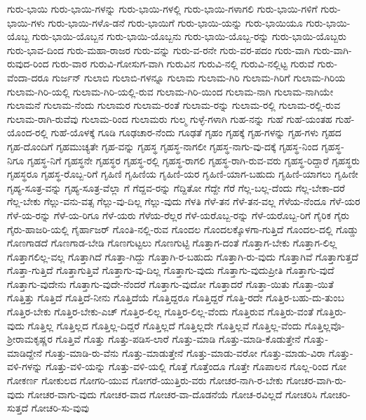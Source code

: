 {ಗುರು-ಭಾಯಿ
ಗುರು-ಭಾಯಿ-ಗಳನ್ನು
ಗುರು-ಭಾಯಿ-ಗಳಲ್ಲಿ
ಗುರು-ಭಾಯಿ-ಗಳಾಗಲಿ
ಗುರು-ಭಾಯಿ-ಗಳಿಗೆ
ಗುರು-ಭಾಯಿ-ಗಳು
ಗುರು-ಭಾಯಿ-ಗಳೊ-ಡನೆ
ಗುರು-ಭಾಯಿಗೆ
ಗುರು-ಭಾಯಿ-ಯನ್ನು
ಗುರು-ಭಾಯಿಯೂ
ಗುರು-ಭಾಯಿ-ಯೊಬ್ಬ
ಗುರು-ಭಾಯಿ-ಯೊಬ್ಬನ
ಗುರು-ಭಾಯಿ-ಯೊಬ್ಬನು
ಗುರು-ಭಾಯಿ-ಯೊಬ್ಬ-ರನ್ನು
ಗುರು-ಭಾಯಿ-ಯೊಬ್ಬರು
ಗುರು-ಭಾವ-ದಿಂದ
ಗುರು-ಮಹಾ-ರಾಜರ
ಗುರು-ವನ್ನು
ಗುರು-ವ-ರನೇ
ಗುರು-ವರ-ಪದಂ
ಗುರು-ವಾಗಿ
ಗುರು-ವಾಗಿ-ರುವುದ-ರಿಂದ
ಗುರು-ವಾರ
ಗುರುವಿ-ಗೋಸುಗ-ವಾಗಿ
ಗುರುವಿನ
ಗುರುವಿ-ನಲ್ಲಿ
ಗುರುವಿ-ನಲ್ಲಿಟ್ಟ
ಗುರುವೆ
ಗುರು-ವೆಂದಾ-ದರೂ
ಗುರ್ಜನ್
ಗುಲಾಬಿ
ಗುಲಾಬಿ-ಗಳನ್ನೂ
ಗುಲಾಮ
ಗುಲಾಮ-ಗಿರಿ
ಗುಲಾಮ-ಗಿರಿಗೆ
ಗುಲಾಮ-ಗಿರಿಯ
ಗುಲಾಮ-ಗಿರಿ-ಯಲ್ಲಿ
ಗುಲಾಮ-ಗಿರಿ-ಯಲ್ಲಿ-ರುವ
ಗುಲಾಮ-ಗಿರಿ-ಯಿಂದ
ಗುಲಾಮ-ನಾಗಿ
ಗುಲಾಮ-ನಾಗಿಯೇ
ಗುಲಾಮನೆ
ಗುಲಾಮ-ನೆಂದು
ಗುಲಾಮರ
ಗುಲಾಮ-ರಂತೆ
ಗುಲಾಮ-ರನ್ನು
ಗುಲಾಮ-ರಲ್ಲಿ
ಗುಲಾಮ-ರಲ್ಲಿ-ರುವ
ಗುಲಾಮ-ರಾಗಿ-ರುವೆವು
ಗುಲಾಮ-ರಿಂದ
ಗುಲಾಮರು
ಗುಲ್ಮ
ಗುಳ್ಳೆ-ಗಳಾಗಿ
ಗುಹ-ನನ್ನು
ಗುಹೆ
ಗುಹೆ-ಯಂತಹ
ಗುಹೆ-ಯೊಂದ-ರಲ್ಲಿ
ಗುಹೆ-ಯೊಳಕ್ಕೆ
ಗೂಡಿ
ಗೂಢಚಾರ-ನೆಂದು
ಗೂಢತೆ
ಗೃಹಂ
ಗೃಹಕ್ಕೆ
ಗೃಹ-ಗಳನ್ನು
ಗೃಹ-ಗಳು
ಗೃಹದ
ಗೃಹ-ದೊಂದಿಗೆ
ಗೃಹಮುಚ್ಯತೇ
ಗೃಹ-ವನ್ನು
ಗೃಹಸ್ಥ
ಗೃಹಸ್ಥ-ನಾಗಲೀ
ಗೃಹಸ್ಥ-ನಾಗು-ವು-ದಕ್ಕೆ
ಗೃಹಸ್ಥ-ನಿಂದ
ಗೃಹಸ್ಥ-ನಿಗೂ
ಗೃಹಸ್ಥ-ನಿಗೆ
ಗೃಹಸ್ಥನೇ
ಗೃಹಸ್ಥರ
ಗೃಹಸ್ಥ-ರಲ್ಲಿ
ಗೃಹಸ್ಥ-ರಾಗಲಿ
ಗೃಹಸ್ಥ-ರಾಗಿ-ರುವ-ವರು
ಗೃಹಸ್ಥ-ರಿದ್ದಾರೆ
ಗೃಹಸ್ಥರು
ಗೃಹಸ್ಥರೂ
ಗೃಹಸ್ಥ-ರೊಬ್ಬ-ರಿಗೆ
ಗೃಹಿಣಿ
ಗೃಹಿಣಿಯ
ಗೃಹಿಣಿ-ಯರ
ಗೃಹಿಣಿ-ಯಾಗ-ಬಹುದು
ಗೃಹಿಣಿ-ಯಾಗಲು
ಗೃಹಿಣೀ
ಗೃಹ್ಯ-ಸೂತ್ರ-ವನ್ನು
ಗೃಹ್ಯ-ಸೂತ್ರ-ವೆಲ್ಲಾ
ಗೆ
ಗೆದ್ದವ-ರನ್ನು
ಗೆದ್ದಿತೋ
ಗೆದ್ದೇ
ಗೆರೆ
ಗೆಲ್ಲ-ಬಲ್ಲ-ದೆಂದು
ಗೆಲ್ಲ-ಬೇಕಾ-ದರೆ
ಗೆಲ್ಲ-ಬೇಕು
ಗೆಲ್ಲು-ವನು-ವತ್ಸ
ಗೆಲ್ಲು-ವು-ದಿಲ್ಲ
ಗೆಲ್ಲು-ವುದು
ಗೆಳತಿ
ಗೆಳೆ-ತನ
ಗೆಳೆ-ತನ-ವಲ್ಲ
ಗೆಳೆಯ-ನೆಂದೂ
ಗೆಳೆ-ಯರ
ಗೆಳೆ-ಯ-ರನ್ನು
ಗೆಳೆ-ಯ-ರಿಗೂ
ಗೆಳೆ-ಯರು
ಗೆಳೆಯ-ರೆಲ್ಲರ
ಗೆಳೆ-ಯರೊಬ್ಬ-ರನ್ನು
ಗೆಳೆ-ಯರೊಬ್ಬ-ರಿಗೆ
ಗೈರಿಕ
ಗೈರು
ಗೈರು-ಹಾಜರಿ-ಯಲ್ಲಿ
ಗೈರ್ಹಾಜರ್
ಗೊಂತಿ-ನಲ್ಲಿ-ರುವ
ಗೊಂದಲ
ಗೊಂದಲಕ್ಕೊಳಗಾ-ಗುತ್ತಿದೆ
ಗೊಂದಲ-ದಲ್ಲಿ
ಗೊಡ್ಡು
ಗೊಣಗಾಡದೆ
ಗೊಣಗಾಡ-ಬೇಡಿ
ಗೊಣಗುಟ್ಟಲು
ಗೊಣಗುಟ್ಟಿ
ಗೊತ್ತಾಗ-ದಂತೆ
ಗೊತ್ತಾಗ-ಬೇಕು
ಗೊತ್ತಾಗ-ಲಿಲ್ಲ
ಗೊತ್ತಾಗಲಿಲ್ಲ-ವಲ್ಲ
ಗೊತ್ತಾಗಿದೆ
ಗೊತ್ತಾ-ಗಿದ್ದು
ಗೊತ್ತಾಗಿ-ರ-ಬಹುದು
ಗೊತ್ತಾಗಿ-ರು-ವುದು
ಗೊತ್ತಾಗಿವೆ
ಗೊತ್ತಾಗುತ್ತದೆ
ಗೊತ್ತಾ-ಗುತ್ತಿದೆ
ಗೊತ್ತಾಗುತ್ತಿವೆ
ಗೊತ್ತಾಗು-ವು-ದಿಲ್ಲ
ಗೊತ್ತಾಗು-ವುದು
ಗೊತ್ತಾಗು-ವುದುಪ್ರೀತಿ
ಗೊತ್ತಾಗು-ವುದೆ
ಗೊತ್ತಾಗು-ವುದೇನು
ಗೊತ್ತಾಗು-ವುದೇ-ನೆಂದರೆ
ಗೊತ್ತಾಗು-ವುದೋ
ಗೊತ್ತಾದರೆ
ಗೊತ್ತಾ-ಯಿತು
ಗೊತ್ತಾ-ಯಿತೆ
ಗೊತ್ತಿತ್ತು
ಗೊತ್ತಿದೆ
ಗೊತ್ತಿದೆ-ನೀನು
ಗೊತ್ತಿದೆಯೆ
ಗೊತ್ತಿದ್ದರೂ
ಗೊತ್ತಿದ್ದರೆ
ಗೊತ್ತಿ-ರದೇ
ಗೊತ್ತಿರ-ಬಹು-ದು-ತುಂಬ
ಗೊತ್ತಿರ-ಬೇಕು
ಗೊತ್ತಿರ-ಬೇಕು-ಎಚ್
ಗೊತ್ತಿರ-ಲಿಲ್ಲ
ಗೊತ್ತಿರ-ಲಿಲ್ಲ-ವೆಂದು
ಗೊತ್ತಿರುವ
ಗೊತ್ತಿರು-ವಂತೆ
ಗೊತ್ತಿರು-ವುದು
ಗೊತ್ತಿಲ್ಲ
ಗೊತ್ತಿಲ್ಲದ
ಗೊತ್ತಿಲ್ಲ-ದಿದ್ದರೆ
ಗೊತ್ತಿಲ್ಲದೆ
ಗೊತ್ತಿಲ್ಲದೇ
ಗೊತ್ತಿಲ್ಲವೆ
ಗೊತ್ತಿಲ್ಲ-ವೆಂದು
ಗೊತ್ತಿಲ್ಲವೊ-ಶ್ರೀರಾಮಕೃಷ್ಣರ
ಗೊತ್ತಿವೆ
ಗೊತ್ತು
ಗೊತ್ತು-ಪಡಿಸ-ಲಾರೆ
ಗೊತ್ತು-ಮಾಡಿ
ಗೊತ್ತು-ಮಾಡಿ-ಕೊಡುತ್ತೇನೆ
ಗೊತ್ತು-ಮಾಡಿದ್ದೇನೆ
ಗೊತ್ತು-ಮಾಡಿ-ರು-ವೆನು
ಗೊತ್ತು-ಮಾಡುತ್ತೇನೆ
ಗೊತ್ತು-ಮಾಡು-ವರೋ
ಗೊತ್ತು-ಮಾಡು-ವಿರಾ
ಗೊತ್ತು-ವಳಿ-ಗಳನ್ನು
ಗೊತ್ತು-ವಳಿ-ಯನ್ನು
ಗೊತ್ತು-ವಳಿ-ಯಲ್ಲಿ
ಗೊತ್ತೆ
ಗೊತ್ತೆಂದೂ
ಗೊತ್ತೇ
ಗೊಪಾಲನ
ಗೊಲ್ಲ-ರಿಂದ
ಗೋ
ಗೋಕರ್ಣ
ಗೋಕುಲದ
ಗೋಗರಿ-ಯುವ
ಗೋಗರೆ-ಯುತ್ತಿರು-ವರು
ಗೋಚರ-ನಾಗಿ-ರ-ಬೇಕು
ಗೋಚರ-ವಾಗಿ-ರು-ವುದು
ಗೋಚರ-ವಾಗು-ವುದು
ಗೋಚರ-ವಾದ
ಗೋಚರ-ವಾ-ದೊಡನೆಯೆ
ಗೋಚ-ರವಿಲ್ಲದೆ
ಗೋಚರಿಸಿ
ಗೋಚರಿ-ಸುತ್ತದೆ
ಗೋಚರಿ-ಸು-ವುವು
}
